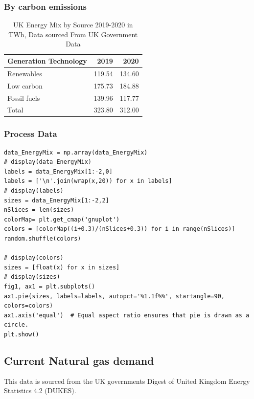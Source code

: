 \documentclass[11pt]{article}
\numberwithin{equation}{section}
\begin{document}
\subsubsection{By carbon emissions}
\label{sec:orgc98f6e2}
\begin{table}[H]
\caption{\label{tabUKEnergyMix2019to20_byCarbonEmmissions_App}UK Energy Mix by Source 2019-2020 in TWh, Data sourced From UK Government Data\cite{ukEnergyConsumptionAll}}
\centering
\begin{tabular}{lrr}
\toprule
Generation Technology & 2019 & 2020\\
\midrule
Renewables & 119.54 & 134.60\\
Low carbon & 175.73 & 184.88\\
Fossil fuels & 139.96 & 117.77\\
\midrule
Total & 323.80 & 312.00\\
\bottomrule
\end{tabular}
\end{table}

\subsubsection{Process Data}
\label{sec:orgaaa3695}
\begin{verbatim}
data_EnergyMix = np.array(data_EnergyMix)
# display(data_EnergyMix)
labels = data_EnergyMix[1:-2,0]
labels = ['\n'.join(wrap(x,20)) for x in labels]
# display(labels)
sizes = data_EnergyMix[1:-2,2]
nSlices = len(sizes)
colorMap= plt.get_cmap('gnuplot')
colors = [colorMap((i+0.3)/(nSlices+0.3)) for i in range(nSlices)]
random.shuffle(colors)

# display(colors)
sizes = [float(x) for x in sizes]
# display(sizes)
fig1, ax1 = plt.subplots()
ax1.pie(sizes, labels=labels, autopct='%1.1f%%', startangle=90, colors=colors)
ax1.axis('equal')  # Equal aspect ratio ensures that pie is drawn as a circle.
plt.show()
\end{verbatim}


\subsection{Current Natural gas demand \label{secAppNatGasDemand}}
\label{sec:org95bb12b}
This data is sourced from the UK governments  Digest of United Kingdom Energy Statistics 4.2 (DUKES)\cite{NaturalGas}.
\end{document}
